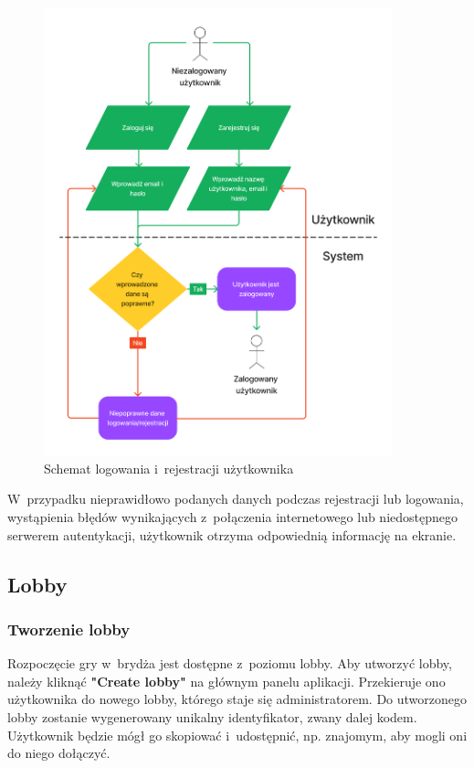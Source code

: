 \begin{figure}[hbt!]
  \centering
  \includegraphics[width=0.9\textwidth]{img/schematy/login.png}
  \caption{Schemat logowania i~rejestracji użytkownika}
\end{figure}

W~przypadku nieprawidłowo podanych danych podczas rejestracji
lub logowania, wystąpienia błędów wynikających z~połączenia internetowego lub
niedostępnego serwerem autentykacji, użytkownik otrzyma odpowiednią
informację na ekranie.

\FloatBarrier


\subsection{Lobby}

\subsubsection{Tworzenie lobby}

Rozpoczęcie gry w~brydża jest dostępne z~poziomu lobby. Aby utworzyć
lobby, należy kliknąć \textbf{"Create lobby"} na głównym panelu
aplikacji. Przekieruje ono użytkownika do nowego lobby, którego staje
się administratorem. Do utworzonego lobby zostanie wygenerowany
unikalny identyfikator, zwany dalej kodem. Użytkownik będzie mógł go skopiować
i~udostępnić, np. znajomym, aby mogli oni do niego dołączyć.


